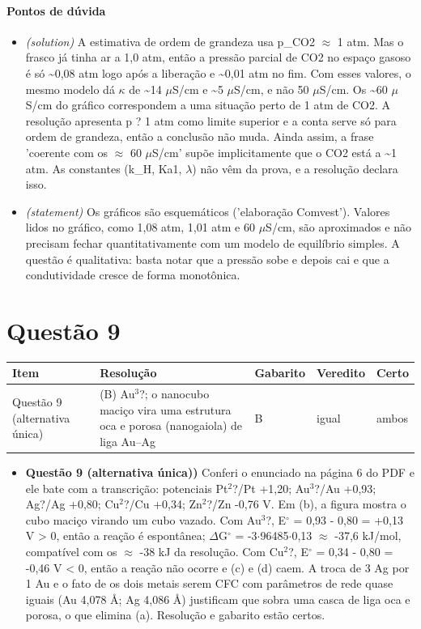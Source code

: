 \documentclass{article}%
\begin{document}
\paragraph{Pontos de dúvida}%
\begin{itemize}%
\item%
\textit{(solution)} A estimativa de ordem de grandeza usa p\_CO2 $\approx$ 1 atm. Mas o frasco já tinha ar a 1,0 atm, então a pressão parcial de CO2 no espaço gasoso é só \textasciitilde{}0,08 atm logo após a liberação e \textasciitilde{}0,01 atm no fim. Com esses valores, o mesmo modelo dá $\kappa$ de \textasciitilde{}14 $\mu$S/cm e \textasciitilde{}5 $\mu$S/cm, e não 50 $\mu$S/cm. Os \textasciitilde{}60 $\mu$S/cm do gráfico correspondem a uma situação perto de 1 atm de CO2. A resolução apresenta p ? 1 atm como limite superior e a conta serve só para ordem de grandeza, então a conclusão não muda. Ainda assim, a frase 'coerente com os $\approx$ 60 $\mu$S/cm' supõe implicitamente que o CO2 está a \textasciitilde{}1 atm. As constantes (k\_H, Ka1, $\lambda$) não vêm da prova, e a resolução declara isso.%
\item%
\textit{(statement)} Os gráficos são esquemáticos ('elaboração Comvest'). Valores lidos no gráfico, como 1,08 atm, 1,01 atm e 60 $\mu$S/cm, são aproximados e não precisam fechar quantitativamente com um modelo de equilíbrio simples. A questão é qualitativa: basta notar que a pressão sobe e depois cai e que a condutividade cresce de forma monotônica.%
\end{itemize}%
\section*{Questão 9}%
\begin{longtable}{@{}p{} p{} p{} p{} p{}@{}}\toprule Item & Resolução & Gabarito & Veredito & Certo \\ \midrule
Questão 9 (alternativa única) & (B) Au$^3$?; o nanocubo maciço vira uma estrutura oca e porosa (nanogaiola) de liga Au--Ag & B & igual & ambos \\
\bottomrule\end{longtable}%
\begin{itemize}%
\item%
\textbf{Questão 9 (alternativa única))} Conferi o enunciado na página 6 do PDF e ele bate com a transcrição: potenciais Pt$^2$?/Pt +1,20; Au$^3$?/Au +0,93; Ag?/Ag +0,80; Cu$^2$?/Cu +0,34; Zn$^2$?/Zn -0,76 V. Em (b), a figura mostra o cubo maciço virando um cubo vazado. Com Au$^3$?, E$^\circ$ = 0,93 - 0,80 = +0,13 V > 0, então a reação é espontânea; $\Delta$G$^\circ$ = -3$\cdot$96485$\cdot$0,13 $\approx$ -37,6 kJ/mol, compatível com os $\approx$ -38 kJ da resolução. Com Cu$^2$?, E$^\circ$ = 0,34 - 0,80 = -0,46 V < 0, então a reação não ocorre e (c) e (d) caem. A troca de 3 Ag por 1 Au e o fato de os dois metais serem CFC com parâmetros de rede quase iguais (Au 4,078 Å; Ag 4,086 Å) justificam que sobra uma casca de liga oca e porosa, o que elimina (a). Resolução e gabarito estão certos.%
\end{itemize}%
\end{document}
